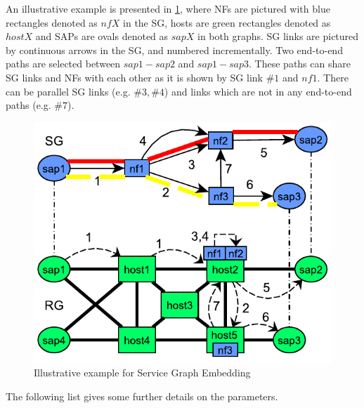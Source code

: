 \documentclass[a4paper,10pt]{scrartcl}
\begin{document}
An illustrative example is presented in \ref{sge}, where NFs are pictured with blue rectangles denoted as $nfX$ in the SG,
 hosts are green rectangles denoted as $hostX$ and SAPs are ovals denoted as $sapX$ in both graphs. 
SG links are pictured by continuous arrows in the SG, and numbered incrementally.
Two end-to-end paths are selected between $sap1-sap2$ and $sap1-sap3$. 
These paths can share SG links and NFs with each other as it is shown by SG link $\#1$ and $nf1$.
There can be parallel SG links (e.g. $\#3, \#4$) and links which are not in any end-to-end paths (e.g. $\#7$).

\begin{figure}
\centering
\includegraphics[scale=1.0]{SGE}
\caption{Illustrative example for Service Graph Embedding}
\label{sge}
\end{figure}

The following list gives some further details on the parameters.
\end{document}

